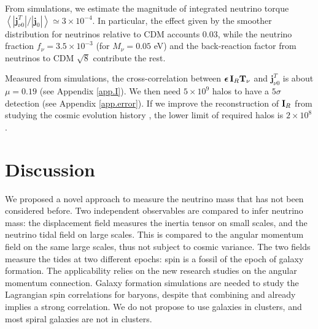 \documentclass[aps,prd,twocolumn,amsmath,amssymb,amsfont,superscriptaddress,nofootinbib]{revtex4-1}
\newcommand{\bs}{\boldsymbol}
\newcommand{\T}{\bold{T}}
\newcommand{\I}{\bold{I}}
\newcommand{\spin}{\bs{j}}
\begin{document}
From simulations, we estimate the magnitude of integrated neutrino torque $\left\langle|\spin^T_{\nu 0}|/|\spin_0|\right\rangle\simeq 3\times10^{-4}$. In particular, the effect given by the smoother distribution for neutrinos relative to CDM accounts 0.03, while the neutrino fraction $f_\nu=3.5\times 10^{-3}$ (for $M_\nu=0.05$ eV) and the back-reaction factor from neutrinos to CDM $\sqrt{8}$ \citep{2012MNRAS.420.2551B} contribute the rest.

Measured from simulations, the cross-correlation between $\bs{\epsilon}\,\I_R\T_\nu$ and $\spin^T_{\nu 0}$ is about $\mu=0.19$ (see Appendix \ref{app.I}). We then need $5\times 10^9$ halos to have a $5\sigma$ detection (see Appendix \ref{app.error}). If we improve the reconstruction of $\I_R$ from studying the cosmic evolution history \citep{2014ApJ...794...94W}, the lower limit of required halos is $2\times 10^8$.

\section{Discussion}\label{sec.discussion}
We proposed a novel approach to measure the neutrino mass that has not been considered before. 
Two independent observables are compared to infer neutrino mass:
the displacement field measures the inertia tensor on small scales, 
and the neutrino tidal field on large scales.
This is compared to the angular momentum field on the same large scales, 
thus not subject to cosmic variance.
The two fields measure the tides at two different epochs: spin is a fossil of the epoch of galaxy formation.
The applicability relies on the new research studies on the angular momentum connection.
Galaxy formation simulations are needed to study the Lagrangian spin correlations for baryons, 
despite that combining \cite{2010MNRAS.404.1137B,2010MNRAS.405..274H,2011MNRAS.415.2607D,2015ApJ...812...29T,2018arXiv180407306J} and \citep{2002MNRAS.332..325P} already implies a strong correlation. 
We do not propose to use galaxies in clusters, and most spiral galaxies are not in clusters.
\end{document}
